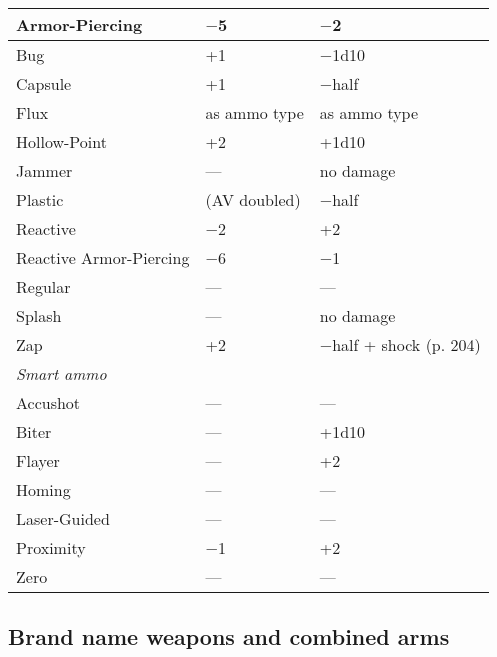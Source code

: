 {{\begin{table}
\begin{tabular}{|l|l|l|}
Armor-Piercing	&$-$5	&$-$2 \\ \hline

Bug	&+1	&$-$1d10 \\ \hline

Capsule	&+1	&$-$half \\ \hline

Flux	&as ammo type	&as ammo type \\ \hline

Hollow-Point	&+2	&+1d10 \\ \hline

Jammer	&--- &no damage \\ \hline

Plastic	&(AV doubled)	&$-$half \\ \hline

Reactive	&$-$2	&+2 \\ \hline

Reactive Armor-Piercing	&$-$6	&$-$1 \\ \hline

Regular	&--- &--- \\ \hline

Splash	&--- &no damage \\ \hline

Zap	&+2	&$-$half + shock (p. 204) \\ \hline

\multicolumn{3}{|l|}{\emph{Smart ammo}} \\ \hline

Accushot	&--- &--- \\ \hline

Biter	&--- &+1d10 \\ \hline

Flayer	&--- &+2 \\ \hline

Homing	&--- &--- \\ \hline

Laser-Guided	&--- &--- \\ \hline

Proximity	&$-$1	&+2 \\ \hline

Zero	&--- &--- \\ \hline

\end{tabular} \label{tab:kinetic-ammo} \end{table} 



\subsection{Brand name weapons and combined arms} \label{sec:brand-weapons-combined} 

}}

